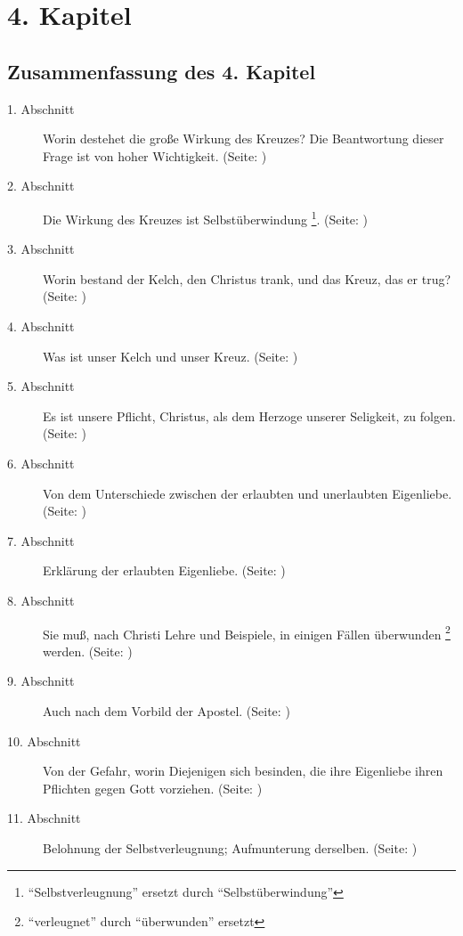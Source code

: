 

\chapter{4. Kapitel} \label{kap4}

\section{Zusammenfassung des 4. Kapitel}
\footnotesize
\begin{description}
\item[1. Abschnitt] Worin destehet die große Wirkung des Kreuzes? Die
Beantwortung dieser Frage ist von hoher Wichtigkeit.
(Seite: \pageref{kap4_ab1})
\item[2. Abschnitt] Die Wirkung des Kreuzes ist Selbstüberwindung \footnote{"`Selbstverleugnung"' ersetzt durch "`Selbstüberwindung"'}.
(Seite: \pageref{kap4_ab2})
\item[3. Abschnitt] Worin bestand der Kelch, den Christus trank, und das Kreuz,
das er trug? (Seite: \pageref{kap4_ab3})
\item[4. Abschnitt]  Was ist unser Kelch und unser Kreuz. (Seite: \pageref{kap4_ab4})
\item[5. Abschnitt] Es ist unsere Pflicht, Christus, als dem Herzoge unserer
Seligkeit, zu folgen. (Seite: \pageref{kap4_ab5})
\item[6. Abschnitt] Von dem Unterschiede zwischen der erlaubten und unerlaubten
Eigenliebe. (Seite: \pageref{kap4_ab6})
\item[7. Abschnitt] Erklärung der erlaubten Eigenliebe. (Seite: \pageref{kap4_ab7})
\item[8. Abschnitt] Sie muß, nach Christi Lehre und Beispiele, in einigen Fällen
überwunden \footnote{"`verleugnet"' durch "`überwunden"' ersetzt} werden. (Seite: \pageref{kap4_ab8})
\item[9. Abschnitt] Auch nach dem Vorbild der Apostel. (Seite: \pageref{kap4_ab9})
\item[10. Abschnitt] Von der Gefahr, worin Diejenigen sich besinden, die ihre
Eigenliebe ihren Pflichten gegen Gott vorziehen. (Seite: \pageref{kap4_ab10})
\item[11. Abschnitt] Belohnung der Selbstverleugnung; Aufmunterung derselben. (Seite: \pageref{kap4_ab11})

\end{description}
